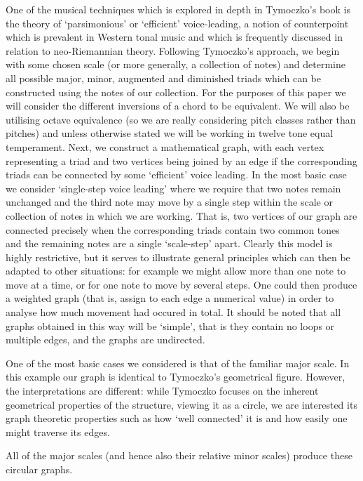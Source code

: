 \documentclass[]{tMAM2e}
\begin{document}
One of the musical techniques which is explored in depth in Tymoczko's book is the theory of `parsimonious' or `efficient' voice-leading, a notion of counterpoint which is prevalent in Western tonal music and which is frequently discussed in relation to neo-Riemannian theory. Following Tymoczko's approach, we begin with some chosen scale (or more generally, a collection of notes) and determine all possible major, minor, augmented and diminished triads which can be constructed using the notes of our collection. For the purposes of this paper we will consider the different inversions of a chord to be equivalent. We will also be utilising octave equivalence (so we are really considering pitch classes rather than pitches) and unless otherwise stated we will be working in twelve tone equal temperament. Next, we construct a mathematical graph, with each vertex representing a triad and two vertices being joined by an edge if the corresponding triads can be connected by some `efficient' voice leading. In the most basic case we consider `single-step voice leading' where we require that two notes remain unchanged and the third note may move by a single step within the scale or collection of notes in which we are working. That is, two vertices of our graph are connected precisely when the corresponding triads contain two common tones and the remaining notes are a single `scale-step' apart. Clearly this model is highly restrictive, but it serves to illustrate general principles which can then be adapted to other situations: for example we might allow more than one note to move at a time, or for one note to move by several steps. One could then produce a weighted graph (that is, assign to each edge a numerical value) in order to analyse how much movement had occured in total. It should be noted that all graphs obtained in this way will be `simple', that is they contain no loops or multiple edges, and the graphs are undirected.

One of the most basic cases we considered is that of the familiar major scale. In this example our graph is identical to Tymoczko's geometrical figure. However, the interpretations are different: while Tymoczko focuses on the inherent geometrical properties of the structure, viewing it as a circle, we are interested its graph theoretic properties such as how `well connected' it is and how easily one might traverse its edges.


All of the major scales (and hence also their relative minor scales) produce these circular graphs.
\end{document}
